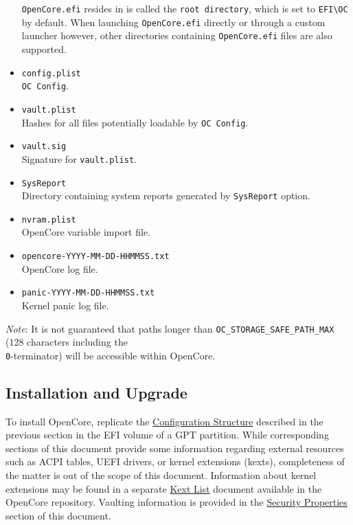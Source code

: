 \documentclass[]{article}
\begin{document}
\begin{itemize}
  \texttt{OpenCore.efi} resides in is called the \texttt{root directory}, which is
  set to \texttt{EFI\textbackslash OC} by default. When launching \texttt{OpenCore.efi}
  directly or through a custom launcher however, other directories containing
  \texttt{OpenCore.efi} files are also supported.
\item
  \texttt{config.plist} \\
  \texttt{OC Config}.
\item
  \texttt{vault.plist} \\
  Hashes for all files potentially loadable by \texttt{OC Config}.
\item
  \texttt{vault.sig} \\
  Signature for \texttt{vault.plist}.
\item
  \texttt{SysReport} \\
  Directory containing system reports generated by \texttt{SysReport} option.
\item
  \texttt{nvram.plist} \\
  OpenCore variable import file.
\item
  \texttt{opencore-YYYY-MM-DD-HHMMSS.txt} \\
  OpenCore log file.
\item
  \texttt{panic-YYYY-MM-DD-HHMMSS.txt} \\
  Kernel panic log file.
\end{itemize}

\emph{Note}: It is not guaranteed that paths longer than
\texttt{OC\_STORAGE\_SAFE\_PATH\_MAX} (128 characters including
the \texttt{\\0}-terminator) will be accessible within OpenCore.

\subsection{Installation and Upgrade}\label{configuration-install}

To install OpenCore, replicate the
\hyperref[configuration-structure]{Configuration Structure} described
in the previous section in the EFI volume of a GPT partition. While
corresponding sections of this document provide some information
regarding external resources such as ACPI tables, UEFI drivers,
or kernel extensions (kexts), completeness of the matter is out of
the scope of this document. Information about kernel extensions may
be found in a separate
\href{https://github.com/acidanthera/OpenCorePkg/blob/master/Docs/Kexts.md}{Kext List}
document available in the OpenCore repository. Vaulting information is provided in
the \hyperref[miscsecurityprops]{Security Properties} section of this document.
\end{document}
